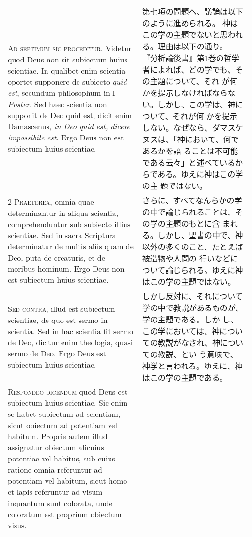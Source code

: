 \documentclass[10pt]{jsarticle} %
\begin{document}
\begin{longtable}{p{21em}p{21em}}


{\Huge A}{\scshape d septimum sic proceditur}. Videtur quod
Deus non sit subiectum huius scientiae. In qualibet enim scientia
oportet supponere de subiecto {\itshape quid est}, secundum philosophum in I
{\itshape Poster}. Sed haec scientia non supponit de Deo quid est, dicit enim
Damascenus, {\itshape in Deo quid est, dicere impossibile est}. Ergo Deus non est
subiectum huius scientiae.


&

第七項の問題へ、議論は以下のように進められる。
神はこの学の主題でないと思われる。理由は以下の通り。
『分析論後書』第1巻の哲学者によれば、どの学でも、その主題について、それ
 が何かを提示しなければならない。しかし、この学は、神について、それが何
 かを提示しない。なぜなら、ダマスケヌスは、「神において、何であるかを語
 ることは不可能である云々」と述べているからである。ゆえに神はこの学の主
 題ではない。


\\


{\scshape 2 Praeterea}, omnia quae determinantur in
aliqua scientia, comprehenduntur sub subiecto illius scientiae. Sed in
sacra Scriptura determinatur de multis aliis quam de Deo, puta de
creaturis, et de moribus hominum. Ergo Deus non est subiectum huius
scientiae.


&

さらに、すべてなんらかの学の中で論じられることは、その学の主題のもとに含
 まれる。しかし、聖書の中で、神以外の多くのこと、たとえば被造物や人間の
 行いなどについて論じられる。ゆえに神はこの学の主題ではない。


\\


{\scshape Sed contra}, illud est subiectum scientiae, de
quo est sermo in scientia. Sed in hac scientia fit sermo de Deo, dicitur
enim theologia, quasi sermo de Deo. Ergo Deus est subiectum huius
scientiae.


&


しかし反対に、それについて学の中で教説があるものが、学の主題である。しか
 し、この学においては、神についての教説がなされ、神についての教説、とい
 う意味で、神学と言われる。ゆえに、神はこの学の主題である。



\\


{\scshape Respondeo dicendum} quod Deus est subiectum
huius scientiae. Sic enim se habet subiectum ad scientiam, sicut
obiectum ad potentiam vel habitum. Proprie autem illud assignatur
obiectum alicuius potentiae vel habitus, sub cuius ratione omnia
referuntur ad potentiam vel habitum, sicut homo et lapis referuntur ad
visum inquantum sunt colorata, unde coloratum est proprium obiectum
visus. 




\end{longtable}
\end{document}
